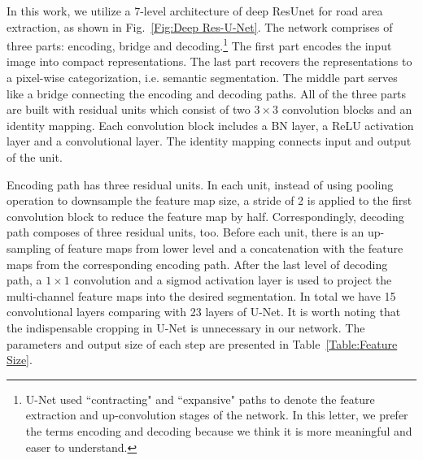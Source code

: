 \documentclass[journal]{IEEEtran}
\begin{document}
In this work, we utilize a 7-level architecture of deep ResUnet for road area extraction, as shown in Fig.~\ref{Fig:Deep Res-U-Net}. The network comprises of three parts: encoding, bridge and decoding.\footnote{U-Net used  ``contracting" and ``expansive" paths to denote the feature extraction and up-convolution stages of the network. In this letter, we prefer the terms encoding and decoding because we think it is more meaningful and easer to understand.} The first part encodes the input image into compact representations. The last part recovers the representations to a pixel-wise categorization, i.e. semantic segmentation. The middle part serves like a bridge connecting the encoding and decoding paths. All of the three parts are built with residual units which consist of two $3\times3$ convolution blocks and an identity mapping. Each convolution block includes a BN layer, a ReLU activation layer and a convolutional layer. The identity mapping connects input and output of the unit. 

Encoding path has three residual units. In each unit, instead of using pooling operation to downsample the feature map size, a stride of 2 is applied to the first convolution block to reduce the feature map by half. Correspondingly, decoding path composes of three residual units, too. Before each unit, there is an up-sampling of feature maps from lower level and a concatenation with the feature maps from the corresponding encoding path. After the last level of decoding path, a $1\times1$ convolution and a sigmod activation layer is used to project the multi-channel feature maps into the desired segmentation. In total we have 15 convolutional layers comparing with 23 layers of U-Net. It is worth noting that the indispensable cropping in U-Net is unnecessary in our network. The parameters and output size of each step are presented in Table~\ref{Table:Feature Size}. 
\end{document}
